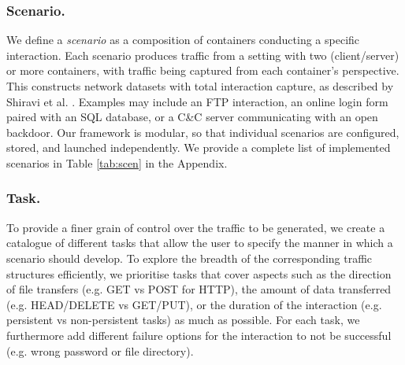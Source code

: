 \subsubsection*{Scenario.}
We define a \emph{scenario} as a composition of containers conducting a specific interaction. Each scenario produces traffic from a setting with two (client/server) or more containers, with traffic being captured from each container's perspective. This constructs network datasets with total interaction capture, as described by Shiravi et al. \cite{shiravi2012toward}.
Examples may include an FTP interaction, an online login form paired with an SQL database, or a C\&C server communicating with an open backdoor. %
Our framework is modular, so that individual scenarios are configured, stored, and launched independently. %
We provide a complete list of implemented scenarios in Table \ref{tab:scen} in the Appendix.

\subsubsection*{Task.} \label{Sec:Subscenarios}

To provide a finer grain of control over the traffic to be generated, we create a catalogue of different tasks that allow the user to specify the manner in which a scenario should develop. %
To explore the breadth of the corresponding traffic structures efficiently, we prioritise tasks that cover aspects such as the direction of file transfers (e.g. GET vs POST for HTTP), the amount of data transferred (e.g. HEAD/DELETE vs GET/PUT), or the duration of the interaction (e.g. persistent vs non-persistent tasks) as much as possible. For each task, we furthermore add different failure options for the interaction to not be successful (e.g. wrong password or file directory). 


